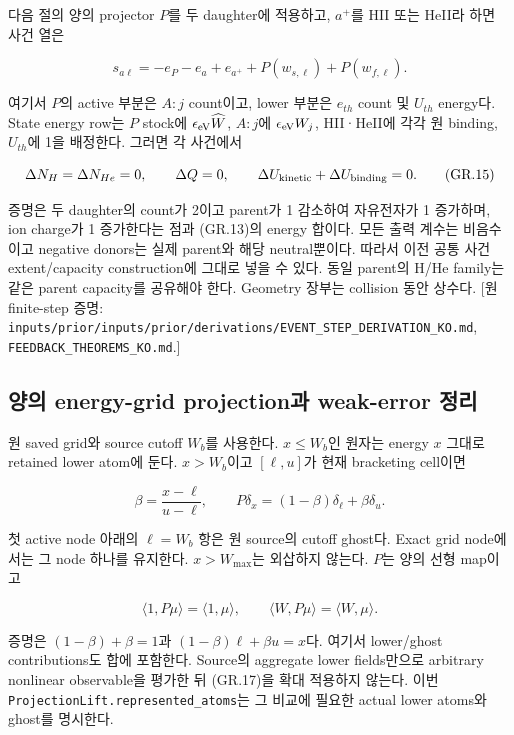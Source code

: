 다음 절의 양의 projector \(P\)를 두 daughter에 적용하고, \(a^+\)를 HII 또는 HeII라 하면 사건 열은

\[
 s_{a\ell}=-e_{P}-e_a+e_{a^+}
   +P(w_{s,\ell})+P(w_{f,\ell}).
\tag{GR.14}
\]

여기서 \(P\)의 active 부분은 \(A:j\) count이고, lower 부분은 \(e_{th}\) count 및 \(U_{th}\) energy다. State energy row는 \(P\) stock에 \(\epsilon_{\rm eV}\widehat W\), \(A:j\)에 \(\epsilon_{\rm eV}W_j\), HII·HeII에 각각 원 binding, \(U_{th}\)에 1을 배정한다. 그러면 각 사건에서

\[
 \Delta N_H=\Delta N_{He}=0,\qquad
 \Delta Q=0,\qquad
 \Delta U_{\rm kinetic}+\Delta U_{\rm binding}=0.
\tag{GR.15}
\]

증명은 두 daughter의 count가 2이고 parent가 1 감소하여 자유전자가 1 증가하며, ion charge가 1 증가한다는 점과 (GR.13)의 energy 합이다. 모든 출력 계수는 비음수이고 negative donors는 실제 parent와 해당 neutral뿐이다. 따라서 이전 공통 사건 extent/capacity construction에 그대로 넣을 수 있다. 동일 parent의 H/He family는 같은 parent capacity를 공유해야 한다. Geometry 장부는 collision 동안 상수다. {[}원 finite-step 증명: \nolinkurl{inputs/prior/inputs/prior/derivations/EVENT_STEP_DERIVATION_KO.md}, \texttt{FEEDBACK\_THEOREMS\_KO.md}.{]}

\hypertarget{uxc591uxc758-energy-grid-projectionuxacfc-weak-error-uxc815uxb9ac}{%
\subsection{양의 energy-grid projection과 weak-error 정리}\label{uxc591uxc758-energy-grid-projectionuxacfc-weak-error-uxc815uxb9ac}}

원 saved grid와 source cutoff \(W_b\)를 사용한다. \(x\le W_b\)인 원자는 energy \(x\) 그대로 retained lower atom에 둔다. \(x>W_b\)이고 \([\ell,u]\)가 현재 bracketing cell이면

\[
 \beta=\frac{x-\ell}{u-\ell},\qquad
 P\delta_x=(1-\beta)\delta_\ell+\beta\delta_u.
\tag{GR.16}
\]

첫 active node 아래의 \(\ell=W_b\) 항은 원 source의 cutoff ghost다. Exact grid node에서는 그 node 하나를 유지한다. \(x>W_{\max}\)는 외삽하지 않는다. \(P\)는 양의 선형 map이고

\[
 \langle1,P\mu\rangle=\langle1,\mu\rangle,\qquad
 \langle W,P\mu\rangle=\langle W,\mu\rangle.
\tag{GR.17}
\]

증명은 \((1-\beta)+\beta=1\)과 \((1-\beta)\ell+\beta u=x\)다. 여기서 lower/ghost contributions도 합에 포함한다. Source의 aggregate lower fields만으로 arbitrary nonlinear observable을 평가한 뒤 (GR.17)을 확대 적용하지 않는다. 이번 \nolinkurl{ProjectionLift.represented_atoms}는 그 비교에 필요한 actual lower atoms와 ghost를 명시한다.

